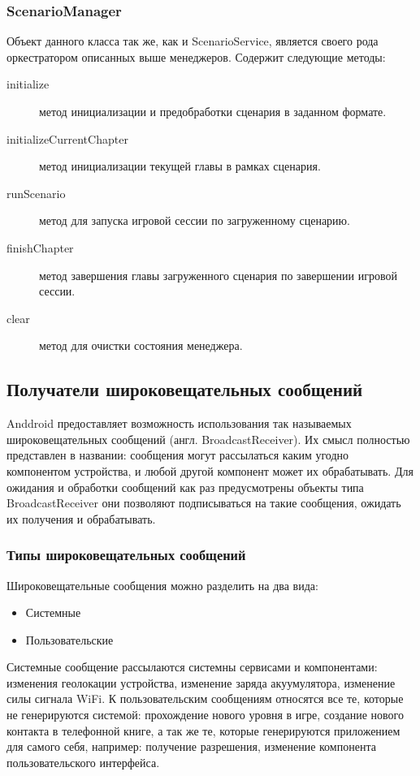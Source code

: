 \subsubsection*{ScenarioManager}
Объект данного класса так же, как и ScenarioService, является своего рода оркестратором описанных выше менеджеров. 
Содержит следующие методы:
\begin{description}
	\item[initialize] метод инициализации и предобработки сценария в заданном формате.
	\item[initializeCurrentChapter] метод инициализации текущей главы в рамках сценария.
	\item[runScenario] метод для запуска игровой сессии по загруженному сценарию.
	\item[finishChapter] метод завершения главы загруженного сценария по завершении игровой сессии.
	\item[clear] метод для очистки состояния менеджера.
\end{description}

\subsection*{Получатели широковещательных сообщений}
Anddroid предоставляет возможность использования так называемых широковещательных сообщений (англ. BroadcastReceiver).
Их смысл полностью представлен в названии: сообщения могут рассылаться каким угодно компонентом устройства, и любой другой компонент может их обрабатывать. Для ожидания и обработки сообщений как раз предусмотрены объекты типа BroadcastReceiver \textemdash\space они позволяют подписываться на такие сообщения, ожидать их получения и обрабатывать.

\subsubsection*{Типы широковещательных сообщений}
Широковещательные сообщения можно разделить на два вида:
\begin{itemize}
	\item Системные
	\item Пользовательские
\end{itemize}
\smallskip
Системные сообщение рассылаются системны сервисами и компонентами: изменения геолокации устройства, изменение заряда акуумулятора, изменение силы сигнала WiFi.
К пользовательским сообщениям относятся все те, которые не генерируются системой: прохождение нового уровня в игре, создание нового контакта в телефонной книге, а так же те, которые генерируются приложением для самого себя, например: получение разрешения, изменение компонента пользовательского интерфейса.

